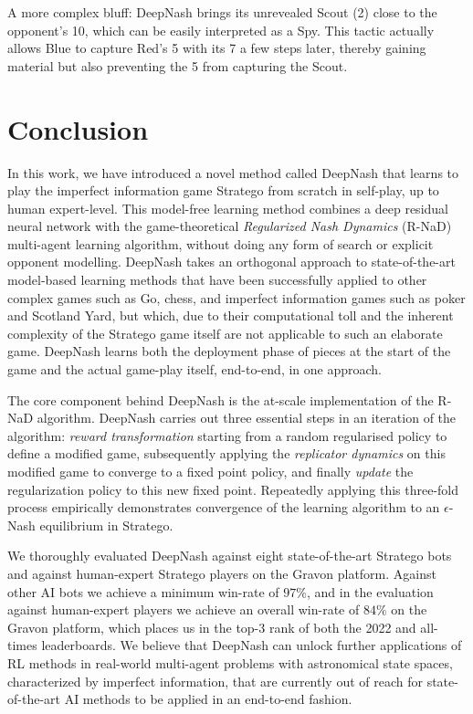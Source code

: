 A more complex bluff: DeepNash brings its unrevealed Scout (2) close to the opponent's 10, which can be easily interpreted as a Spy. This tactic actually allows Blue to capture Red's 5 with its 7 a few steps later, thereby gaining material but also preventing the 5 from capturing the Scout.

\section{Conclusion}
In this work, we have introduced a novel method called DeepNash that learns to play the imperfect information game Stratego from scratch in self-play, up to human expert-level. This model-free learning method combines a deep residual neural network with the game-theoretical \emph{Regularized Nash Dynamics} (R-NaD) multi-agent learning algorithm, without doing any form of search or explicit opponent modelling. DeepNash takes an orthogonal approach to state-of-the-art model-based learning methods that have been successfully applied to other complex games such as Go, chess, and imperfect information games such as poker and Scotland Yard, but which, due to their computational toll and the inherent complexity of the Stratego game itself are not applicable to such an elaborate game. DeepNash learns both the deployment phase of pieces at the start of the game and the actual game-play itself, end-to-end, in one approach.

The core component behind DeepNash is the at-scale implementation of the R-NaD algorithm. DeepNash carries out three essential steps in an iteration of the algorithm: \emph{reward transformation} starting from a random regularised policy to define a modified game, subsequently applying the \emph{replicator dynamics} on this modified game to converge to a fixed point policy, and finally \emph{update} the regularization policy to this new fixed point. Repeatedly applying this three-fold process empirically demonstrates convergence of the learning algorithm to an $\epsilon$-Nash equilibrium in Stratego.

We thoroughly evaluated DeepNash against eight state-of-the-art Stratego bots and against human-expert Stratego players on the Gravon platform. Against other AI bots we achieve a minimum win-rate of $97\%$, and in the evaluation against human-expert players we achieve an overall win-rate of $84\%$ on the Gravon platform, which places us in the top-3 rank of both the 2022 and all-times leaderboards. We believe that DeepNash can unlock further applications of RL methods in real-world multi-agent problems with astronomical state spaces, characterized by imperfect information, that are currently out of reach for state-of-the-art AI methods to be applied in an end-to-end fashion.

